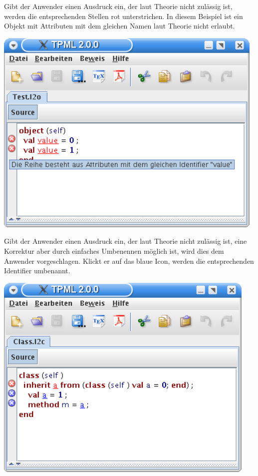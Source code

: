 {
  Gibt der Anwender einen Ausdruck ein, der laut Theorie nicht zulässig ist, werden die entsprechenden
  Stellen rot unterstrichen. In diesem Beispiel ist ein Objekt mit Attributen mit dem gleichen Namen
  laut Theorie nicht erlaubt.
  \begin{center}
    \includegraphics[height=10cm]{images/parser_error.png}
  \end{center}
}

{
  Gibt der Anwender einen Ausdruck ein, der laut Theorie nicht zulässig ist, eine Korrektur aber durch
  einfaches Umbenennen möglich ist, wird dies dem Anwender vorgeschlagen. Klickt er auf das blaue Icon,
  werden die entsprechenden Identifier umbenannt.
  \begin{center}
    \includegraphics[height=10cm]{images/parser_rename.png}
  \end{center}
}